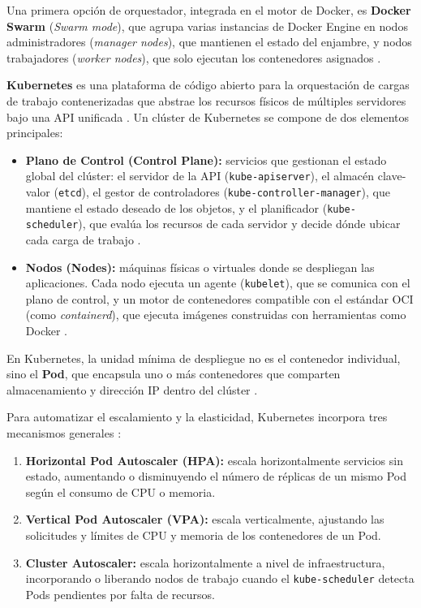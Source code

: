 Una primera opción de orquestador, integrada en el motor de Docker, es \textbf{Docker Swarm} (\textit{Swarm mode}), que agrupa varias instancias de Docker Engine en nodos administradores (\textit{manager nodes}), que mantienen el estado del enjambre, y nodos trabajadores (\textit{worker nodes}), que solo ejecutan los contenedores asignados \cite{docker_swarm_2024}.

\textbf{Kubernetes} es una plataforma de código abierto para la orquestación de cargas de trabajo contenerizadas que abstrae los recursos físicos de múltiples servidores bajo una API unificada \cite{k8s_components_2024}. Un clúster de Kubernetes se compone de dos elementos principales:

\begin{itemize}
    \item \textbf{Plano de Control (Control Plane):} servicios que gestionan el estado global del clúster: el servidor de la API (\texttt{kube-apiserver}), el almacén clave-valor (\texttt{etcd}), el gestor de controladores (\texttt{kube-controller-manager}), que mantiene el estado deseado de los objetos, y el planificador (\texttt{kube-scheduler}), que evalúa los recursos de cada servidor y decide dónde ubicar cada carga de trabajo \cite{k8s_components_2024}.
    \item \textbf{Nodos (Nodes):} máquinas físicas o virtuales donde se despliegan las aplicaciones. Cada nodo ejecuta un agente (\texttt{kubelet}), que se comunica con el plano de control, y un motor de contenedores compatible con el estándar OCI (como \textit{containerd}), que ejecuta imágenes construidas con herramientas como Docker \cite{k8s_components_2024}.
\end{itemize}

En Kubernetes, la unidad mínima de despliegue no es el contenedor individual, sino el \textbf{Pod}, que encapsula uno o más contenedores que comparten almacenamiento y dirección IP dentro del clúster \cite{k8s_components_2024}.

Para automatizar el escalamiento y la elasticidad, Kubernetes incorpora tres mecanismos generales \cite{k8s_autoscaling_2024}:
\begin{enumerate}
    \item \textbf{Horizontal Pod Autoscaler (HPA):} escala horizontalmente servicios sin estado, aumentando o disminuyendo el número de réplicas de un mismo Pod según el consumo de CPU o memoria.
    \item \textbf{Vertical Pod Autoscaler (VPA):} escala verticalmente, ajustando las solicitudes y límites de CPU y memoria de los contenedores de un Pod.
    \item \textbf{Cluster Autoscaler:} escala horizontalmente a nivel de infraestructura, incorporando o liberando nodos de trabajo cuando el \texttt{kube-scheduler} detecta Pods pendientes por falta de recursos.
\end{enumerate}

